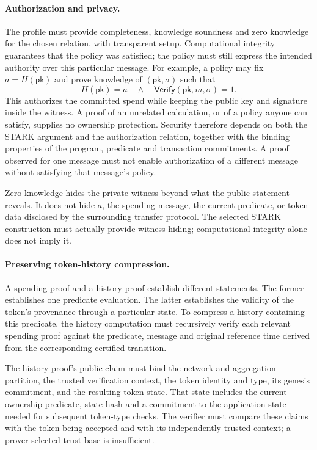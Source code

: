 \paragraph{Authorization and privacy.}
The profile must provide completeness, knowledge soundness and zero knowledge for the chosen relation, with transparent setup. Computational integrity guarantees that the policy was satisfied; the policy must still express the intended authority over this particular message. For example, a policy may fix $a=H(\mathsf{pk})$ and prove knowledge of $(\mathsf{pk},\sigma)$ such that
\[
H(\mathsf{pk})=a
\quad\land\quad
\mathsf{Verify}(\mathsf{pk},m,\sigma)=1.
\]
This authorizes the committed spend while keeping the public key and signature inside the witness. A proof of an unrelated calculation, or of a policy anyone can satisfy, supplies no ownership protection. Security therefore depends on both the STARK argument and the authorization relation, together with the binding properties of the program, predicate and transaction commitments. A proof observed for one message must not enable authorization of a different message without satisfying that message's policy.

Zero knowledge hides the private witness beyond what the public statement reveals. It does not hide $a$, the spending message, the current predicate, or token data disclosed by the surrounding transfer protocol. The selected STARK construction must actually provide witness hiding; computational integrity alone does not imply it.

\paragraph{Preserving token-history compression.}\label{sec:stark-history-compression}
A spending proof and a history proof establish different statements. The former establishes one predicate evaluation. The latter establishes the validity of the token's provenance through a particular state. To compress a history containing this predicate, the history computation must recursively verify each relevant spending proof against the predicate, message and original reference time derived from the corresponding certified transition.

The history proof's public claim must bind the network and aggregation partition, the trusted verification context, the token identity and type, its genesis commitment, and the resulting token state. That state includes the current ownership predicate, state hash and a commitment to the application state needed for subsequent token-type checks. The verifier must compare these claims with the token being accepted and with its independently trusted context; a prover-selected trust base is insufficient.

